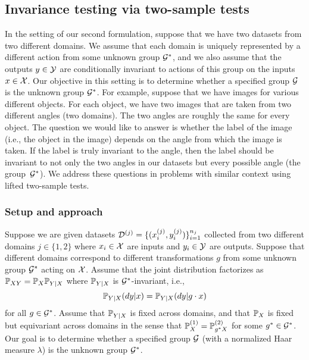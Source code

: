 \subsection{Invariance testing via two-sample tests} \label{sec:twosample}

In the setting of our second formulation, suppose that we have two datasets from two different domains. We assume that each domain is uniquely represented by a different action from some unknown group $\calG^*$, and we also assume that the outputs $y\in\calY$ are conditionally invariant to actions of this group on the inputs $x\in\calX$. Our objective in this setting is to determine whether a specified group $\calG$ is the unknown group $\calG^*$. For example, suppose that we have images for various different objects. For each object, we have two images that are taken from two different angles (two domains). The two angles are roughly the same for every object. The question we would like to answer is whether the label of the image (i.e., the object in the image) depends on the angle from which the image is taken. If the label is truly invariant to the angle, then the label should be invariant to not only the two angles in our datasets but every possible angle (the group~$\calG^*$). We address these questions in problems with similar context using lifted two-sample tests.

\subsubsection{Setup and approach}

Suppose we are given datasets $\calD^{(j)}=\{(x_i^{(j)},y_i^{(j)})\}_{i=1}^{n_j}$ collected from two different domains $j\in\{1,2\}$ where $x_i\in\calX$ are inputs and $y_i\in\calY$ are outputs. Suppose that different domains correspond to different transformations $g$ from some unknown group $\calG^*$ acting on $\calX$. Assume that the joint distribution factorizes as $\P_{XY}=\P_X\P_{Y|X}$ where $\P_{Y|X}$ is $\calG^*$-invariant, i.e.,
\[
\bbP_{Y|X}(dy|x) = \bbP_{Y|X}(dy|g\cdot x)
\]
for all $g\in\calG^*$. Assume that $\P_{Y|X}$ is fixed across domains, and that $\P_X$ is fixed but equivariant across domains in the sense that $\P_X^{(1)}=\P_{g^*X}^{(2)}$ for some $g^*\in\calG^*$. Our goal is to determine whether a specified group $\calG$ (with a normalized Haar measure $\lambda$) is the unknown group $\calG^*$.
\\


